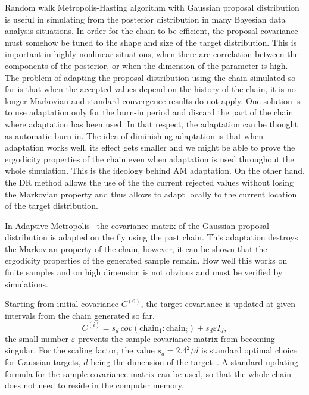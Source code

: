 Random walk Metropolis-Hasting algorithm with Gaussian proposal distribution is useful in simulating from the posterior distribution in many Bayesian data analysis situations.
% 
In order for the chain to be efficient, the proposal covariance must somehow be tuned to the shape and size of the target distribution. This is important in highly nonlinear situations, when there are correlation between the components of the posterior, or when the dimension of the parameter is high. The problem of adapting the proposal distribution using the chain simulated so far is that when the accepted values depend on the history of the chain, it is no longer Markovian and standard convergence results do not apply. One solution is to use adaptation only for the burn-in period and discard the part of the chain where adaptation has been used. In that respect, the adaptation can be thought as automatic burn-in. The idea of diminishing adaptation is that when adaptation works well, its effect gets smaller and we might be able to prove the ergodicity properties of the chain even when adaptation is used throughout the whole simulation. This is the ideology behind AM adaptation. On the other hand, the DR 
method allows the use of the the current rejected values without losing the Markovian property and thus allows to adapt locally to the current location of the target distribution.

In Adaptive Metropolis~\cite{HaSaTa01} the covariance matrix of the Gaussian proposal distribution is adapted on the fly using the past chain. This adaptation destroys the Markovian property of the chain, however, it can be shown that the ergodicity properties of the generated sample remain. How well this works on finite samples and on high dimension is not obvious and must be verified by simulations.

Starting from initial covariance $C^{(0)}$, the target covariance is updated at given intervals from the chain generated so far.
$$
C^{(i)} = s_d \, cov(\text{chain}_1:\text{chain}_i) + s_d \varepsilon I_d,
$$
the small number $\varepsilon$ prevents the sample covariance matrix from becoming singular. For the scaling factor, the value $s_d = 2.4^2/d$ is standard optimal choice for Gaussian targets, $d$ being the dimension of the target~\cite{GelmanEtAl2004}. A standard updating formula for the sample covariance matrix can be used, so that the whole chain does not need to reside in the computer memory.

